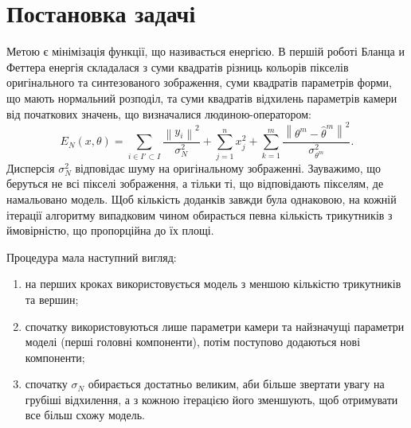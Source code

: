 \section{Постановка задачі}

Метою є мінімізація функції, що називається енергією.
В першій роботі Бланца и Феттера \cite{blanz:romdhani:vetter}
енергія складалася з
суми квадратів різниць кольорів пікселів
оригінального та синтезованого зображення,
суми квадратів параметрів форми, що мають нормальний розподіл,
та суми квадратів відхилень параметрів камери від початкових значень,
що визначалися людиною-оператором:
\begin{equation}\label{eq:energy:blanz}
  E_N\left( x, \theta \right)
  = \sum_{i \in I' \subset I}
      \frac{\left\| y_i \right\|^2}{\sigma^2_N}
  + \sum_{j = 1}^{n} x_j^2
  + \sum_{k = 1}^{m}
      \frac{\left\| \theta^m - \hat{\theta}^m \right\|^2}
           {\sigma^2_{\theta^m}}.
\end{equation}
Дисперсія $\sigma_N^2$ відповідає шуму на оригінальному зображенні.
Зауважимо, що беруться не всі пікселі зображення,
а тільки ті, що відповідають пікселям, де намальовано модель.
Щоб кількість доданків завжди була однаковою,
на кожній ітерації алгоритму випадковим чином
обирається певна кількість трикутників
з ймовірністю, що пропорційна до їх площі.

Процедура мала наступний вигляд:
\begin{enumerate}
  \item на перших кроках використовується модель
    з меншою кількістю трикутників та вершин;
  \item спочатку використовуються лише параметри камери
    та найзначущі параметри моделі (перші головні компоненти),
    потім поступово додаються нові компоненти;
  \item спочатку $\sigma_N$ обирається достатньо великим,
    аби більше звертати увагу на грубіші відхилення,
    а з кожною ітерацією його зменшують,
    щоб отримувати все більш схожу модель.
\end{enumerate}

